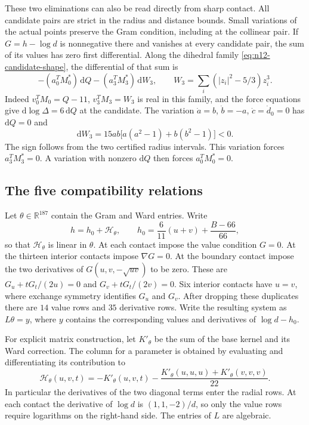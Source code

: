 \documentclass[11pt,letterpaper]{article}
\theoremstyle{remark}
\begin{document}
These two eliminations can also be read directly from sharp contact. All candidate pairs are strict in the radius and distance bounds. Small variations of the actual points preserve the Gram condition, including at the collinear pair. If $G=h-\log d$ is nonnegative there and vanishes at every candidate pair, the sum of its values has zero first differential. Along the dihedral family \eqref{eq:n12-candidate-shape}, the differential of that sum is
\[
 -(a_0^TM_0^*)\,\mathrm dQ-(a_3^TM_3^*)\,\mathrm dW_3,
 \qquad W_3=\sum_i (|z_i|^2-5/3)z_i^3.
\]
Indeed $v_0^TM_0=Q-11$, $v_3^TM_3=W_3$ is real in this family, and the force equations give $\mathrm d\log\Delta=6\,\mathrm dQ$ at the candidate. The variation $\dot a=b$, $\dot b=-a$, $\dot c=\dot d_0=0$ has $\mathrm dQ=0$ and
\[
 \mathrm dW_3=15ab\bigl[a(a^2-1)+b(b^2-1)\bigr]<0.
\]
The sign follows from the two certified radius intervals. This variation forces $a_3^TM_3^*=0$. A variation with nonzero $\mathrm dQ$ then forces $a_0^TM_0^*=0$.

\subsection{The five compatibility relations}

Let $\theta\in\mathbb R^{187}$ contain the Gram and Ward entries. Write
\[
 h=h_0+\mathcal H_\theta,
 \qquad h_0=\frac6{11}(u+v)+\frac{B-66}{66},
\]
so that $\mathcal H_\theta$ is linear in $\theta$. At each contact impose the value condition $G=0$. At the thirteen interior contacts impose $\nabla G=0$. At the boundary contact impose the two derivatives of $G(u,v,-\sqrt{uv})$ to be zero. These are $G_u+tG_t/(2u)=0$ and $G_v+tG_t/(2v)=0$. Six interior contacts have $u=v$, where exchange symmetry identifies $G_u$ and $G_v$. After dropping these duplicates there are $14$ value rows and $35$ derivative rows. Write the resulting system as $L\theta=y$, where $y$ contains the corresponding values and derivatives of $\log d-h_0$.

For explicit matrix construction, let $K'_\theta$ be the sum of the base kernel and its Ward correction. The column for a parameter is obtained by evaluating and differentiating its contribution to
\[
 \mathcal H_\theta(u,v,t)=-K'_\theta(u,v,t)
 -\frac{K'_\theta(u,u,u)+K'_\theta(v,v,v)}{22}.
\]
In particular the derivatives of the two diagonal terms enter the radial rows. At each contact the derivative of $\log d$ is $(1,1,-2)/d$, so only the value rows require logarithms on the right-hand side. The entries of $L$ are algebraic.
\end{document}
